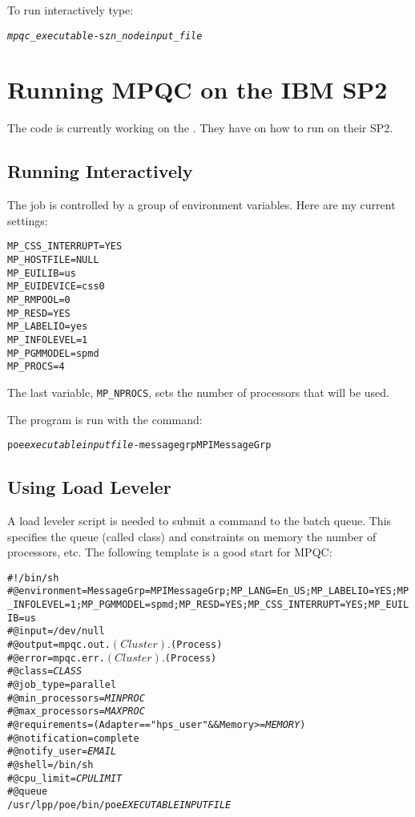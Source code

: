 To run interactively type:
\begin{alltt}
{\itshape mpqc_executable} -sz {\itshape n_node} {\itshape input_file}
\end{alltt}

\section{Running MPQC on the IBM SP2}

The code is currently working on the
.
They have 
on how to run on their SP2.

\subsection{Running Interactively}

The job is controlled by a group of environment variables.
Here are my current settings:
\begin{verbatim}
MP_CSS_INTERRUPT=YES
MP_HOSTFILE=NULL
MP_EUILIB=us
MP_EUIDEVICE=css0
MP_RMPOOL=0
MP_RESD=YES
MP_LABELIO=yes
MP_INFOLEVEL=1
MP_PGMMODEL=spmd
MP_PROCS=4
\end{verbatim}
The last variable, \verb|MP_NPROCS|, sets the number
of processors that will be used.

The program is run with the command:
\begin{alltt}
poe {\itshape executable} {\itshape inputfile} -messagegrp MPIMessageGrp
\end{alltt}

\subsection{Using Load Leveler}

A load leveler script is needed to submit a command to the batch queue.
This specifies the queue (called class) and constraints on memory the
number of processors, etc.  The following template is a good start for
MPQC:

\begin{alltt}
#!/bin/sh
#@ environment = MessageGrp=MPIMessageGrp;MP_LANG=En_US;MP_LABELIO=YES;MP_INFOLEVEL=1;MP_PGMMODEL=spmd;MP_RESD=YES;MP_CSS_INTERRUPT=YES;MP_EUILIB=us
#@ input = /dev/null
#@ output = mpqc.out.$(Cluster).$(Process)
#@ error = mpqc.err.$(Cluster).$(Process)
#@ class = {\itshape CLASS}
#@ job_type = parallel
#@ min_processors = {\itshape MINPROC}
#@ max_processors = {\itshape MAXPROC}
#@ requirements =  (Adapter == "hps_user" && Memory >= {\itshape MEMORY})
#@ notification = complete
#@ notify_user = {\itshape EMAIL}
#@ shell = /bin/sh
#@ cpu_limit = {\itshape CPULIMIT}
#@ queue
/usr/lpp/poe/bin/poe {\itshape EXECUTABLE} {\itshape INPUTFILE}
\end{alltt}

